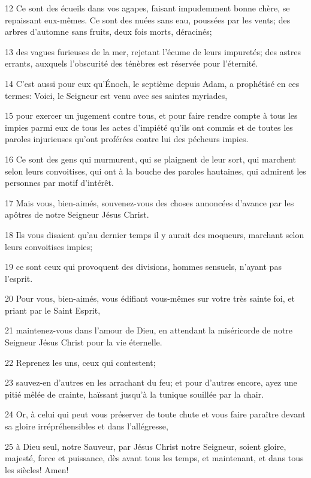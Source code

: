 \par 12 Ce sont des écueils dans vos agapes, faisant impudemment bonne chère, se repaissant eux-mêmes. Ce sont des nuées sans eau, poussées par les vents; des arbres d'automne sans fruits, deux fois morts, déracinés;
\par 13 des vagues furieuses de la mer, rejetant l'écume de leurs impuretés; des astres errants, auxquels l'obscurité des ténèbres est réservée pour l'éternité.
\par 14 C'est aussi pour eux qu'Énoch, le septième depuis Adam, a prophétisé en ces termes: Voici, le Seigneur est venu avec ses saintes myriades,
\par 15 pour exercer un jugement contre tous, et pour faire rendre compte à tous les impies parmi eux de tous les actes d'impiété qu'ils ont commis et de toutes les paroles injurieuses qu'ont proférées contre lui des pécheurs impies.
\par 16 Ce sont des gens qui murmurent, qui se plaignent de leur sort, qui marchent selon leurs convoitises, qui ont à la bouche des paroles hautaines, qui admirent les personnes par motif d'intérêt.
\par 17 Mais vous, bien-aimés, souvenez-vous des choses annoncées d'avance par les apôtres de notre Seigneur Jésus Christ.
\par 18 Ils vous disaient qu'au dernier temps il y aurait des moqueurs, marchant selon leurs convoitises impies;
\par 19 ce sont ceux qui provoquent des divisions, hommes sensuels, n'ayant pas l'esprit.
\par 20 Pour vous, bien-aimés, vous édifiant vous-mêmes sur votre très sainte foi, et priant par le Saint Esprit,
\par 21 maintenez-vous dans l'amour de Dieu, en attendant la miséricorde de notre Seigneur Jésus Christ pour la vie éternelle.
\par 22 Reprenez les uns, ceux qui contestent;
\par 23 sauvez-en d'autres en les arrachant du feu; et pour d'autres encore, ayez une pitié mêlée de crainte, haïssant jusqu'à la tunique souillée par la chair.
\par 24 Or, à celui qui peut vous préserver de toute chute et vous faire paraître devant sa gloire irrépréhensibles et dans l'allégresse,
\par 25 à Dieu seul, notre Sauveur, par Jésus Christ notre Seigneur, soient gloire, majesté, force et puissance, dès avant tous les temps, et maintenant, et dans tous les siècles! Amen!


